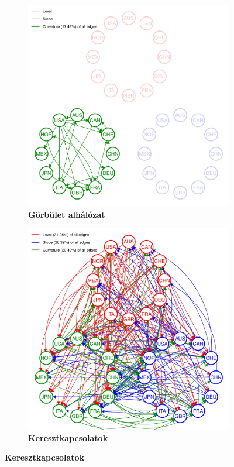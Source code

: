\documentclass[12pt,bibliography=totoc]{article}
\begin{document}
\begin{figure}[H]
  \medskip

  \begin{subfigure}[t]{.35\textwidth}
    \centering
    \includegraphics[width=\linewidth]{All_plot_onlycurv_2004-07-01_2019-12-31_0.01-page-001}
    \caption{\textbf{Görbület alhálózat}}
  \end{subfigure}
  \hfill
  \begin{subfigure}[t]{.35\textwidth}
    \centering
    \includegraphics[width=\linewidth]{All_plot_innerempty_2004-07-01_2019-12-31_0.01-page-001}
    \caption{\textbf{Keresztkapcsolatok}}
  \end{subfigure}
\end{figure}
\end{document}
